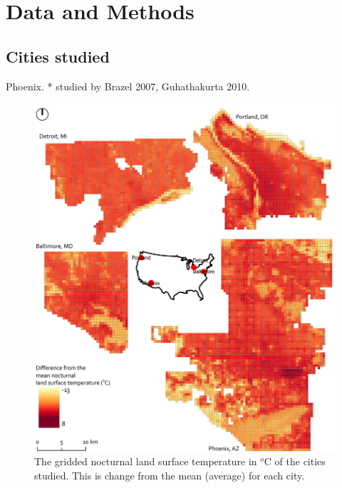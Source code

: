 \documentclass[final,3p,times,twocolumn,sort&compress]{elsarticle}
\begin{document}
\section{Data and Methods}
\subsection{Cities studied}

Phoenix.
* studied by Brazel 2007, Guhathakurta 2010.

\begin{figure}
    \centering
    \includegraphics[width=\textwidth]{fig/report/map_nocturnal_lst.pdf}
    \caption{The gridded nocturnal land surface temperature in $^o$C of the cities studied. This is change from the mean (average) for each city.}
    \label{fig:map}
\end{figure}
\end{document}

